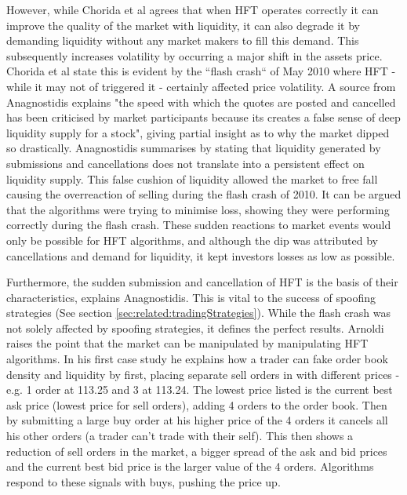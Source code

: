 However, while Chorida et al \cite{REPORT:ChordiaEtAl:2013} agrees that when HFT operates correctly it can improve the quality of the market with liquidity, it can also degrade it by demanding liquidity without any market makers to fill this demand. This subsequently increases volatility by occurring a major shift in the assets price. Chorida et al state this is evident by the ``flash crash`` of May 2010 where HFT - while it may not of triggered it - certainly affected price volatility. A source from Anagnostidis \cite{UNPUB:Anagnostidis:2017} explains "the speed with which the quotes are posted and cancelled has been criticised by market participants because its creates a false sense of deep liquidity supply for a stock", giving partial insight as to why the market dipped so drastically. Anagnostidis summarises by stating that liquidity generated by submissions and cancellations does not translate into a persistent effect on liquidity supply. This false cushion of liquidity allowed the market to free fall causing the overreaction of selling during the flash crash of 2010. It can be argued that the algorithms were trying to minimise loss, showing they were performing correctly during the flash crash. These sudden reactions to market events would only be possible for HFT algorithms, and although the dip was attributed by cancellations and demand for liquidity, it kept investors losses as low as possible.

Furthermore, the sudden submission and cancellation of HFT is the basis of their characteristics, explains Anagnostidis. This is vital to the success of spoofing strategies (See section \ref{sec:related:tradingStrategies}). While the flash crash was not solely affected by spoofing strategies, it defines the perfect results. Arnoldi \cite{JOURNAL:Arnoldi:2016} raises the point that the market can be manipulated by manipulating HFT algorithms. In his first case study he explains how a trader can fake order book density and liquidity by first, placing separate sell orders in with different prices - e.g. 1 order at 113.25 and 3 at 113.24. The lowest price listed is the current best ask price (lowest price for sell orders), adding 4 orders to the order book. Then by submitting a large buy order at his higher price of the 4 orders it cancels all his other orders (a trader can't trade with their self). This then shows a reduction of sell orders in the market, a bigger spread of the ask and bid prices and the current best bid price is the larger value of the 4 orders. Algorithms respond to these signals with buys, pushing the price up. 

